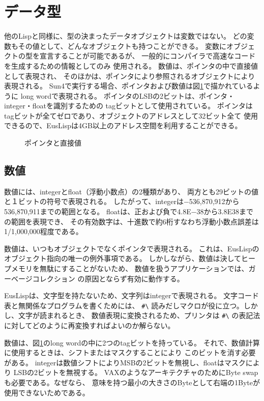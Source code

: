 \section{データ型}
他のLispと同様に、型の決まったデータオブジェクトは変数ではない。
どの変数もその値として、どんなオブジェクトも持つことができる。
変数にオブジェクトの型を宣言することが可能であるが、
一般的にコンパイラで高速なコードを生成するための情報としてのみ
使用される。
数値は、ポインタの中で直接値として表現され、
そのほかは、ポインタにより参照されるオブジェクトにより表現される。
Sun4で実行する場合、ポインタおよび数値は図\ref{Pointer}で描かれているように
long wordで表現される。
ポインタのLSBの2ビットは、ポインタ・integer・floatを識別するための
tagビットとして使用されている。
ポインタはtagビットが全てゼロであり、オブジェクトのアドレスとして32ビット全て
使用できるので、EusLispは4GB以上のアドレス空間を利用することができる。

\begin{figure}[hb]
\begin{center}
\end{center}
\caption{\label{Pointer}ポインタと直接値}
\end{figure}

\subsection{数値}
数値には、integerとfloat（浮動小数点）の2種類があり、
両方とも29ビットの値と１ビットの符号で表現される。
したがって、integerは$-$536,870,912から536,870,911までの範囲となる。
floatは、正および負で4.8E$-$38から3.8E38までの範囲を表現でき、
その有効数字は、十進数で約6桁すなわち浮動小数点誤差は1/1,000,000程度である。

数値は、いつもオブジェクトでなくポインタで表現される。
これは、EusLispのオブジェクト指向の唯一の例外事項である。
しかしながら、数値は決してヒープメモリを無駄にすることがないため、
数値を扱うアプリケーションでは、ガーベージコレクション
の原因とならず有効に動作する。

EusLispは、文字型を持たないため、文字列はintegerで表現される。
文字コード表と無関係なプログラムを書くためには、
\verb+#\+ 読みだしマクロが役に立つ。しかし、文字が読まれるとき、
数値表現に変換されるため、プリンタは
\verb+#\+ の表記法に対してどのように再変換すればよいのか解らない。

数値は、図\ref{Pointer}のlong wordの中に2つのtagビットを持っている。
それで、数値計算に使用するときは、シフトまたはマスクすることにより
このビットを消す必要がある。
integerは数値シフトによりMSBの2ビットを無視し、floatはマスクにより
LSBの2ビットを無視する。
VAXのようなアーキテクチャのためにByte swapも必要である。なぜなら、
意味を持つ最小の大きさのByteとして右端の1Byteが使用できないためである。


